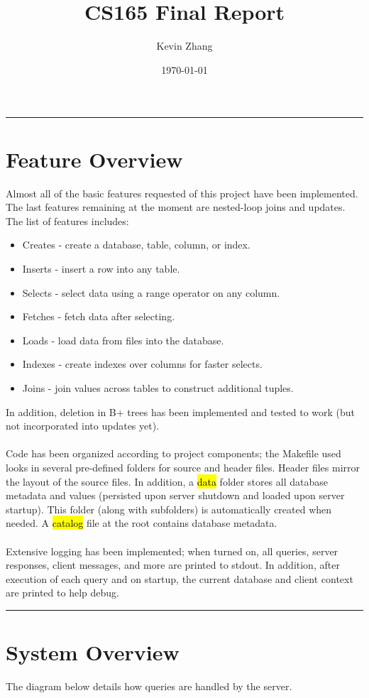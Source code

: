 \documentclass[paper=letter, fontsize=11pt]{scrartcl}
\title{	
\normalfont \normalsize 
\horrule{0.5pt} \\[0.4cm]
\huge CS165 Final Report
}
\author{Kevin Zhang}
\date{\normalsize\today}
\numberwithin{equation}{section}
\numberwithin{figure}{section}
\numberwithin{table}{section}
\newcommand{\horrule}[1]{\rule{\linewidth}{#1}}
\renewcommand{\texttt}[1]{\hl{\ttfamily #1}}
\begin{document}
\maketitle

\horrule{0.5pt}
\section{Feature Overview}
Almost all of the basic features requested of this project have been implemented.  The last features remaining at the moment are nested-loop joins and updates.  The list of features includes:
\begin{itemize}
	\item Creates - create a database, table, column, or index.
	\item Inserts - insert a row into any table.
	\item Selects - select data using a range operator on any column.
	\item Fetches - fetch data after selecting.
	\item Loads - load data from files into the database.
	\item Indexes - create indexes over columns for faster selects.
	\item Joins - join values across tables to construct additional tuples.
\end{itemize}
In addition, deletion in B+ trees has been implemented and tested to work (but not incorporated into updates yet).
\\\\Code has been organized according to project components; the Makefile used looks in several pre-defined folders for source and header files.  Header files mirror the layout of the source files.  In addition, a \texttt{data} folder stores all database metadata and values (persisted upon server shutdown and loaded upon server startup).  This folder (along with subfolders) is automatically created when needed.  A \texttt{catalog} file at the root contains database metadata.
\\\\Extensive logging has been implemented; when turned on, all queries, server responses, client messages, and more are printed to stdout.  In addition, after execution of each query and on startup, the current database and client context are printed to help debug.

\horrule{0.5pt} 
\section{System Overview}
The diagram below details how queries are handled by the server.
    
\end{document}
